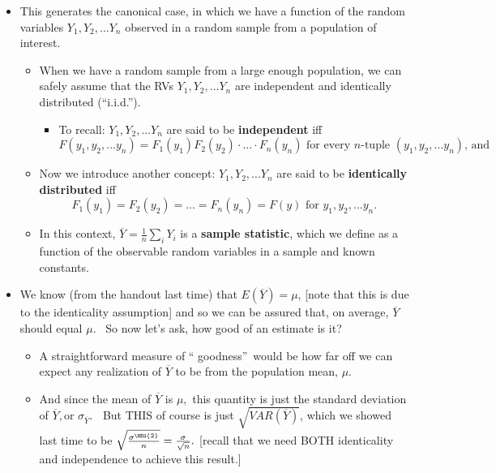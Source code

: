 \documentclass[11pt]{article}
\begin{document}
\begin{itemize}
\item This generates the canonical case, in which we have a function of the
random variables $Y_{1},Y_{2},...Y_{n}$ observed in a random sample from a
population of interest.

\begin{itemize}
\item When we have a random sample from a large enough population, we can
safely assume that the RVs $Y_{1},Y_{2},...Y_{n}$ are independent and
identically distributed (\textquotedblleft i.i.d.\textquotedblright ). \ 

\begin{itemize}
\item To recall: $Y_{1},Y_{2},...Y_{n}$ are said to be \textbf{independent}
iff%
\begin{equation*}
F(y_{1},y_{2},...y_{n})=F_{1}(y_{1})F_{2}(y_{2})\cdot ...\cdot F_{n}(y_{n})%
\text{ for every }n\text{-tuple }(y_{1},y_{2},...y_{n})\text{, and}
\end{equation*}
\end{itemize}

\item Now we introduce another concept: $Y_{1},Y_{2},...Y_{n}$ are said to
be \textbf{identically distributed} iff%
\begin{equation*}
F_{1}(y_{1})=F_{2}(y_{2})=...=F_{n}(y_{n})=F(y)\text{ for }%
y_{1},y_{2},...y_{n}.
\end{equation*}

\item In this context, $\overline{Y}=\frac{1}{n}\sum_{i}Y_{i}$ is a \textbf{%
sample statistic}, which we define as a function of the observable random
variables in a sample and known constants.\ 
\end{itemize}

\item We know (from the handout last time) that $E(\overline{Y})=\mu $,
[note that this is due to the identicality assumption] and so we can be
assured that, on average, $\overline{Y}$ should equal $\mu .$ \ So now let's
ask, how good of an estimate is it? \ 

\begin{itemize}
\item A straightforward measure of \textquotedblleft
goodness\textquotedblright\ would be how far off we can expect any
realization of $\overline{Y}$ to be from the population mean, $\mu .$ \ 

\item And since the mean of $\overline{Y}$ is $\mu ,$ this quantity is just
the standard deviation of $\overline{Y},$or $\sigma _{\overline{Y}}$. $\ $%
But THIS of course is just $\sqrt{VAR(\overline{Y})}$, which we showed last
time to be $\sqrt{\frac{\sigma ^{\NEG{2}}}{n}}=\frac{\sigma }{\sqrt{n}}.$
[recall that we need BOTH identicality and independence to achieve this
result.]


\end{itemize}
\end{itemize}
\end{document}
